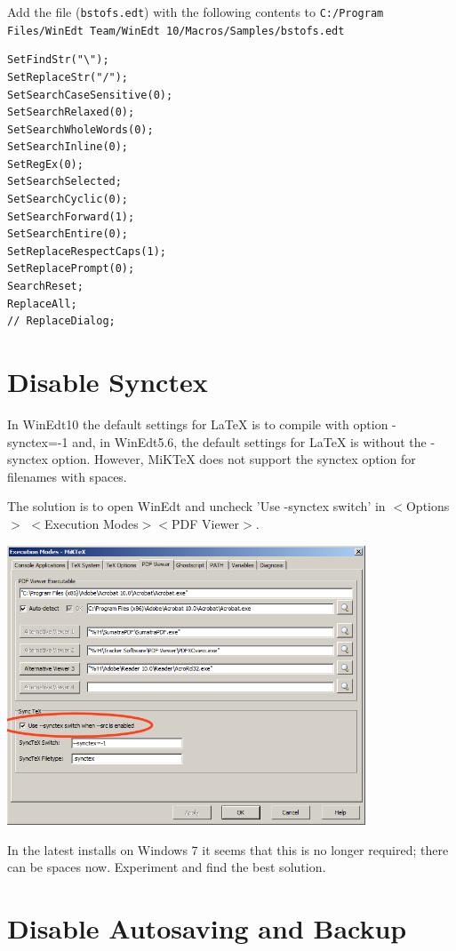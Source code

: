 Add the file (\lstinline{bstofs.edt}) with the following contents to
\lstinline{C:/Program Files/WinEdt Team/WinEdt 10/Macros/Samples/bstofs.edt} 

\begin{lstlisting}
SetFindStr("\");
SetReplaceStr("/");
SetSearchCaseSensitive(0);
SetSearchRelaxed(0);
SetSearchWholeWords(0);
SetSearchInline(0);
SetRegEx(0);
SetSearchSelected;
SetSearchCyclic(0);
SetSearchForward(1);
SetSearchEntire(0);
SetReplaceRespectCaps(1);
SetReplacePrompt(0);
SearchReset;
ReplaceAll;
// ReplaceDialog;
\end{lstlisting}


\section{Disable Synctex}

In WinEdt10 the default settings for LaTeX is to compile with option -synctex=-1 and, in WinEdt5.6, the default settings for LaTeX is without the -synctex option.
However, MiKTeX does not support the synctex option for filenames with spaces.

The solution is to open WinEdt and uncheck 'Use -synctex switch' in $<$Options$>$ $<$Execution Modes$>$$<$PDF Viewer$>$.

\centerline{\includegraphics[bb= 0 0 696 543,width=0.8\textwidth]{eps/synctex.png}}

In the latest installs on Windows 7 it seems that this is no longer required; there can be spaces now. Experiment and find the best solution.


\section{Disable Autosaving and Backup}

